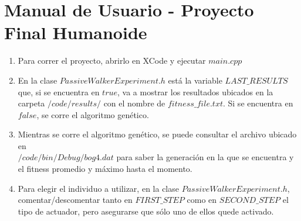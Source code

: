 \documentclass{article}
\begin{document}
\newpage


\section*{ Manual de Usuario - Proyecto Final Humanoide}

\begin{enumerate}
\item{ Para correr el proyecto, abrirlo en XCode y ejecutar $main.cpp$
}

\item En la clase $PassiveWalkerExperiment.h$ est\'a la variable $LAST\_RESULTS$ que, si se encuentra en $true$, va a mostrar los resultados ubicados en la carpeta $/code/results/$ con el nombre de $fitness\_file.txt$. Si se encuentra en $false$, se corre el algoritmo gen\'etico.

\item Mientras se corre el algoritmo gen\'etico, se puede consultar el archivo ubicado en \\$/code/bin/Debug/bog4.dat$ para saber la generaci\'on en la que se encuentra y el fitness promedio y m\'aximo hasta el momento.

\item Para elegir el individuo a utilizar, en la clase $PassiveWalkerExperiment.h$, comentar/descomentar tanto en $FIRST\_STEP$ como en $SECOND\_STEP$ el tipo de actuador, pero asegurarse que s\'olo uno de ellos quede activado.

\end{enumerate}
\end{document}
